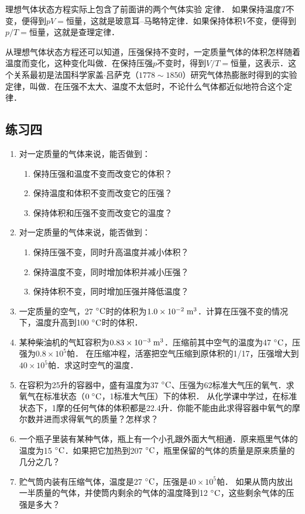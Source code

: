 理想气体状态方程实际上包含了前面讲的两个气体实验
定律．
如果保持温度$T$不变，便得到$pV=\text{恒量}$，这就是玻意耳--马略特定律．如果保持体积$V$不变，便得到$p/T=\text{恒量}$，这就是查理定律．

从理想气体状态方程还可以知道，压强保持不变时，一定质量气体的体积怎样随着温度而变化，这种变化叫做．在保持压强$p$不变时，得到$V/T=\text{恒量}$，这表示．这个关系最初是法国科学家盖$\cdot$吕萨克（$1778 \sim 1850$）研究气体热膨胀时得到的实验定律，叫做．在压强不太大、温度不太低时，不论什么气体都近似地符合这个定律．


\subsection*{练习四}

\begin{enumerate}
    \item 对一定质量的气体来说，能否做到：
    \begin{enumerate}
    \item    保持压强和温度不变而改变它的体积？
    \item    保持温度和体积不变而改变它的压强？
    \item    保持体积和压强不变而改变它的温度？     
    \end{enumerate}
\item  对一定质量的气体来说，能否做到：
\begin{enumerate}
\item 保持压强不变，同时升高温度并减小体积？
\item 保持温度不变，同时增加体积并减小压强？
\item 保持体积不变，同时增加压强并降低温度？
\end{enumerate}

\item  一定质量的空气，27$\;{}^\circ\text{C}$时的体积为$1.0\times 10^{-2} \;\text{m}^3$．计算在压强不变的情况下，温度升高到100$\;{}^\circ\text{C}$时的体积．
\item  某种柴油机的气缸容积为$0.83\times 10^{-3} \;\text{m}^3$．压缩前其中空气的温度为47$\;{}^\circ\text{C}$，压强为$0.8\times 10^5$帕．
在压缩冲程，活塞把空气压缩到原体积的1/17，压强增大到$40\times 10^5$帕．求这时空气的温度．
\item  在容积为25升的容器中，盛有温度为37$\;{}^\circ\text{C}$、压强为62标准大气压的氧气．求氧气在标准状态（$0 \;{}^\circ\text{C}$，1标准大气压）下的体积．
从化学课中学过，在标准状态下，1摩的任何气体的体积都是22.4升．你能不能由此求得容器中氧气的摩尔数并进而求得氧气的质量？怎样求？
\item  一个瓶子里装有某种气体，瓶上有一个小孔跟外面大气相通．原来瓶里气体的温度为15$\;{}^\circ\text{C}$．如果把它加热到207$\;{}^\circ\text{C}$，瓶里保留的气体的质量是原来质量的几分之几？
\item  贮气筒内装有压缩气体，温度是27$\;{}^\circ\text{C}$，压强是$40\times 10^5$帕．
如果从筒内放出一半质量的气体，并使筒内剩余的气体的温度降到12$\;{}^\circ\text{C}$，这些剩余气体的压强是多大？

\end{enumerate}


